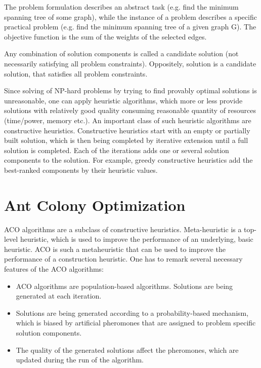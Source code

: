 \documentclass[12pt,a4paper,oneside]{book}
\begin{document}
The problem formulation describes an abstract task (e.g. find the minimum spanning tree of some graph), while the instance of a problem describes a specific practical problem (e.g. find the minimum spanning tree of a given graph G). The objective function is the sum of the weights of the selected edges. \par

Any combination of solution components is called a candidate solution (not necessarily satisfying all problem constraints). Oppositely, solution is a candidate solution, that satisfies all problem constraints.

Since solving of NP-hard problems by trying to find provably optimal solutions is unreasonable, one can apply heuristic algorithms, which more or less provide solutions with relatively good quality consuming reasonable quantity of resources (time/power, memory etc.). An important class of such heuristic algorithms are constructive heuristics. Constructive heuristics start with an empty or partially built solution, which is then being completed by iterative extension until a full solution is completed. Each of the iterations adds one or several solution components to the solution. For example, greedy constructive heuristics  add the best-ranked components by their heuristic values.




\section{Ant Colony Optimization}

ACO algorithms are a subclass of constructive heuristics. Meta-heuristic is a top-level heuristic, which is used to improve the performance of an underlying, basic heuristic. ACO is such a metaheuristic that can be used to improve the performance of a construction heuristic. One has to remark several necessary features of the ACO algorithms:

\begin{itemize}
\item ACO algorithms are population-based algorithms. Solutions are being generated at each iteration.
\item Solutions are being generated according to a probability-based mechanism, which is biased by artificial pheromones that are assigned to problem specific solution components.
\item The quality of the generated solutions affect the pheromones, which are updated during the run of the algorithm.
\end{itemize}
\end{document}
